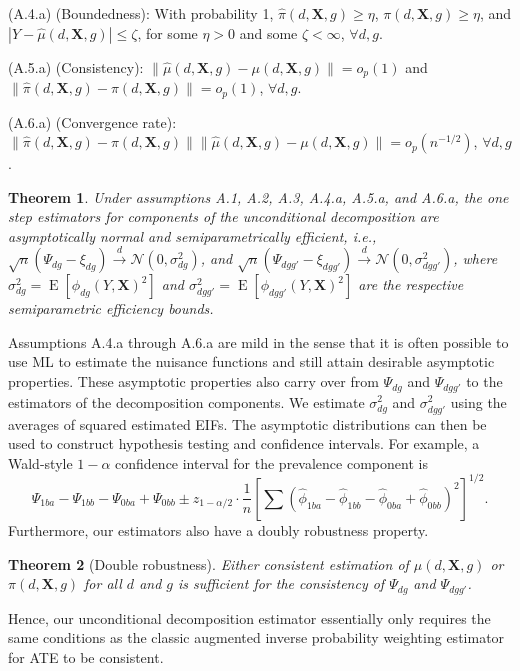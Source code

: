 \documentclass[12pt,a4paper]{article}
\newtheorem{prop}{Theorem}
\newcommand{\E}{\operatorname{E}}
\def\X{{\boldsymbol X}}
\begin{document}
(A.4.a) (Boundedness): With probability 1, $\hat{\pi}(d,\X,g) \geq \eta$, $\pi(d,\X,g) \geq \eta$, and $|Y-\hat{\mu}(d,\X,g)| \leq \zeta$, for some $\eta>0$ and some $\zeta < \infty$, $\forall d, g$.

(A.5.a) (Consistency):  $\| \hat{\mu}(d,\X,g) - \mu(d,\X,g) \| =o_p(1)$ and $\| \hat{\pi}(d,\X,g) - \pi(d,\X,g) \| =o_p(1)$, $\forall d, g$.

(A.6.a) (Convergence rate):  $\|\hat{\pi}(d,\X,g)-\pi(d,\X,g)\| \|\hat{\mu}(d,\X,g)-\mu(d,\X,g)\|=o_p(n^{-1/2})$, $\forall d, g$.

\begin{prop}
Under assumptions A.1, A.2, A.3, A.4.a, A.5.a, and A.6.a, the one step estimators for components of the unconditional decomposition are asymptotically normal and semiparametrically efficient, i.e., $\sqrt{n}(\Psi_{dg} - \xi_{dg}) \xrightarrow{d} \mathcal{N}(0, \sigma^2_{dg})$, and $\sqrt{n}(\Psi_{dgg'} - \xi_{dgg'}) \xrightarrow{d} \mathcal{N}(0, \sigma^2_{dgg'})$, where $\sigma^2_{dg}=\E[\phi_{dg}(Y,\X)^2]$ and $\sigma^2_{dgg'}=\E[\phi_{dgg'}(Y,\X)^2]$ are the respective semiparametric efficiency bounds. 
\end{prop}
Assumptions A.4.a through A.6.a are mild in the sense that it is often possible to use ML to estimate the nuisance functions and still attain desirable asymptotic properties. These asymptotic properties also carry over from $\Psi_{dg}$ and $\Psi_{dgg'}$ to the estimators of the decomposition components. We estimate $\sigma^2_{dg}$ and $\sigma^2_{dgg'}$ using the  averages of squared estimated EIFs. The asymptotic distributions can then be used to construct hypothesis testing and confidence intervals. For example, a Wald-style $1-\alpha$ confidence interval for the prevalence component is $$\Psi_{1ba}-\Psi_{1bb}-\Psi_{0ba}+\Psi_{0bb} \pm z_{1-\alpha/2} \cdot \frac{1}{n} \left[\sum  \left(\hat{\phi}_{1ba}-\hat{\phi}_{1bb}-  \hat{\phi}_{0ba}+\hat{\phi}_{0bb}\right)^2 \right]^{1/2}.$$ Furthermore, our estimators also have a doubly robustness property. 

\begin{prop}[Double robustness]
Either consistent estimation of $\mu(d,\X,g)$ or $\pi(d,\X,g)$ for all $d$ and $g$ is sufficient for the consistency of $\Psi_{dg}$ and $\Psi_{dgg'}$.  
\end{prop}
Hence, our unconditional decomposition estimator essentially only requires the same conditions as the classic augmented inverse probability weighting estimator for ATE \citep{robins_estimation_1994, hirano_efficient_2003} to be consistent. 
\end{document}
